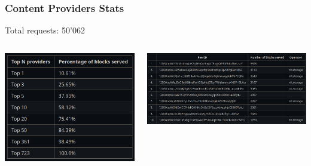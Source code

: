 \documentclass{pl-slide}
\begin{document}
\begin{frame}
\frametitle{Content Providers Stats}
\greencube\hspace{0.4em} Total requests: 50'062
\begin{columns}[onlytextwidth]
\begin{column}{0.35\textwidth}
    \begin{center}
		\includegraphics[width=\textwidth]{plots/top_provs.png}
    \end{center}
\end{column}
\begin{column}{0.64\textwidth}
    \begin{center}
		\includegraphics[width=\textwidth]{plots/top10.png}
    \end{center}
\end{column}
\end{columns}
\end{frame}
\end{document}
